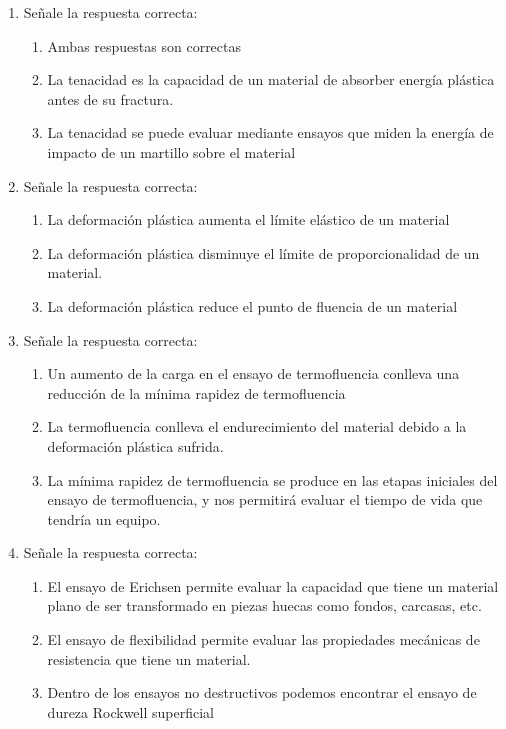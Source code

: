 \begin{enumerate}[label=\textbf{\arabic*.}]
    \item Señale la respuesta correcta:
          \begin{enumerate}[label=\alph*.]
              \item Ambas respuestas son correctas
              \item La tenacidad es la capacidad de un material de absorber energía plástica antes de su fractura.
              \item \textcolor{red!85!black}{La tenacidad se puede evaluar mediante ensayos que miden la energía de impacto de un martillo sobre el material}
          \end{enumerate}

    \item Señale la respuesta correcta:
          \begin{enumerate}[label=\alph*.]
              \item \textcolor{red!85!black}{La deformación plástica aumenta el límite elástico de un material}
              \item La deformación plástica disminuye el límite de proporcionalidad de un material.
              \item La deformación plástica reduce el punto de fluencia de un material
          \end{enumerate}

    \item Señale la respuesta correcta:
          \begin{enumerate}[label=\alph*.]
              \item Un aumento de la carga en el ensayo de termofluencia conlleva una reducción de la mínima rapidez de termofluencia
              \item \textcolor{red!85!black}{La termofluencia conlleva el endurecimiento del material debido a la deformación plástica sufrida.}
              \item La mínima rapidez de termofluencia se produce en las etapas iniciales del ensayo de termofluencia, y nos permitirá evaluar el tiempo de vida que tendría un equipo.
          \end{enumerate}

    \item Señale la respuesta correcta:
          \begin{enumerate}[label=\alph*.]
              \item \textcolor{red!85!black}{El ensayo de Erichsen permite evaluar la capacidad que tiene un material plano de ser transformado en piezas huecas como fondos, carcasas, etc.}
              \item El ensayo de flexibilidad permite evaluar las propiedades mecánicas de resistencia que tiene un material.
              \item Dentro de los ensayos no destructivos podemos encontrar el ensayo de dureza Rockwell superficial
          \end{enumerate}


\end{enumerate}
